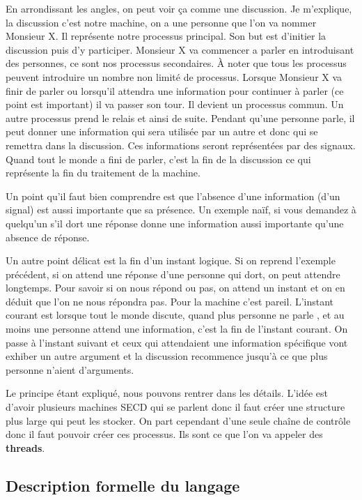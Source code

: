 \documentclass[10pt,a4paper]{report}
\begin{document}
	En arrondissant les angles, on peut voir ça comme une discussion. Je m'explique, la discussion c'est notre machine, on a une personne que l'on va nommer Monsieur X. Il représente notre processus principal. Son but est d'initier la discussion puis d'y participer.
	\smallbreak 
	Monsieur X va commencer a parler en introduisant des personnes, ce sont nos processus secondaires. À noter que tous les processus peuvent introduire un nombre non limité de processus. Lorsque Monsieur X va finir de parler ou lorsqu'il attendra une information pour continuer à parler (ce point est important) il va passer son tour. Il devient un processus commun. Un autre processus prend le relais et ainsi de suite.
	\smallbreak
	Pendant qu'une personne parle, il peut donner une information qui sera utilisée par un autre et donc qui se remettra dans la discussion. Ces informations seront représentées par des signaux. Quand tout le monde a fini de parler, c'est la fin de la discussion ce qui représente la fin du traitement de la machine.
	\medbreak
	
	Un point qu'il faut bien comprendre est que l'absence d'une information (d'un signal) est aussi importante que sa présence. Un exemple naïf, si vous demandez à quelqu'un s'il dort une réponse donne une information aussi importante qu'une absence de réponse.
	\medbreak
	
	Un autre point délicat est la fin d'un instant logique. Si on reprend l'exemple précédent, si on attend une réponse d'une personne qui dort, on peut attendre longtemps. Pour savoir si on nous répond ou pas, on attend un instant et on en déduit que l'on ne nous répondra pas. Pour la machine c'est pareil. L'instant courant est lorsque tout le monde discute, quand plus personne ne parle , et au moins une personne attend une information, c'est la fin de l'instant courant. On passe à l'instant suivant et ceux qui attendaient une information spécifique vont exhiber un autre argument et la discussion recommence jusqu'à ce que plus personne n'aient d'arguments.
	\medbreak
	
	Le principe étant expliqué, nous pouvons rentrer dans les détails. L'idée est d'avoir plusieurs machines SECD qui se parlent donc il faut créer une structure plus large qui peut les stocker. On part cependant d'une seule chaîne de contrôle donc il faut pouvoir créer ces processus. Ils sont ce que l'on va appeler des \textbf{threads}.
	\newpage
	
	
	
	\subsection{Description formelle du langage}
	
\end{document}
